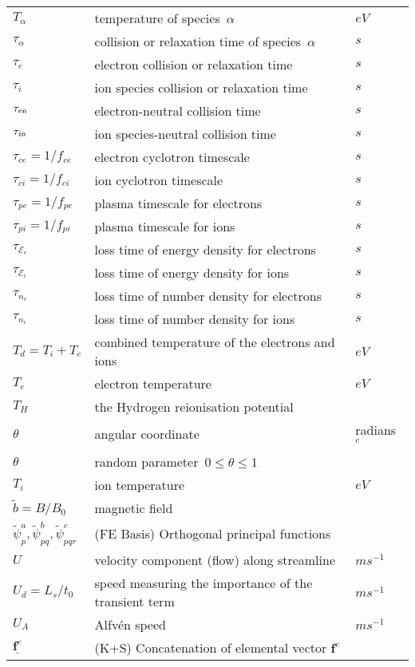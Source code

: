 \begin{longtable}{|p{3.0cm}|p{10.0cm}|p{3.0cm}|}
$T_\alpha$ & temperature of species~$\alpha$  & $eV$ \\
$\tau_\alpha$ & collision or relaxation time of species~$\alpha$   & $s$ \\
$\tau_e$ & electron collision or relaxation time   & $s$ \\
$\tau_i$ & ion species collision or relaxation time   & $s$ \\
$\tau_{e{\sf n}} $ & electron-neutral collision time   & $s$ \\
$\tau_{i{\sf n}} $ & ion species-neutral collision time   & $s$ \\
$\tau_{ce}=1/f_{ce}$ & electron cyclotron timescale & $s$ \\
$\tau_{ci}=1/f_{ci}$ & ion cyclotron timescale & $s$ \\
$\tau_{pe}=1/f_{pe}$ & plasma timescale for electrons & $s$ \\
$\tau_{pi}=1/f_{pi}$ & plasma timescale for ions & $s$ \\
$\tau_{\mathcal{E}_e}$ & loss time of energy density for electrons   & $s$ \\
$\tau_{\mathcal{E}_i}$ & loss time of energy density for ions   & $s$ \\
$\tau_{n_e}$ & loss time of number density for electrons   & $s$ \\
$\tau_{n_i}$ & loss time of number density for ions   & $s$ \\
$T_d=T_i+T_e$ & combined temperature of the electrons and ions  & $eV$ \\
$T_e$ & electron temperature  & $eV$ \\
$T_H$ & the Hydrogen reionisation potential  & \\
$\theta$ & angular coordinate & radians $^c$ \\
$\theta$ & random parameter~$0\leq\theta\leq 1$ & \\
$T_i$ & ion temperature  & $eV$ \\
$\tilde{b}=B/B_0$ & magnetic field & \\
$\tilde{\psi}^a_p, \tilde{\psi}^b_{pq}, \tilde{\psi}^c_{pqr}$ &  (FE Basis) Orthogonal principal functions & \\
$U$ & velocity component (flow) along streamline  & $m s^{-1}$ \\
$U_d =L_s/t_0$ & speed measuring the importance of the transient term  & $m s^{-1}$ \\
$U_A$  & Alfv\'{e}n speed  & $m s^{-1}$ \\
$\underline{\boldsymbol{f}^e}$ &  (K+S) Concatenation of elemental vector $\boldsymbol{f}^e$ & \\

\end{longtable}
